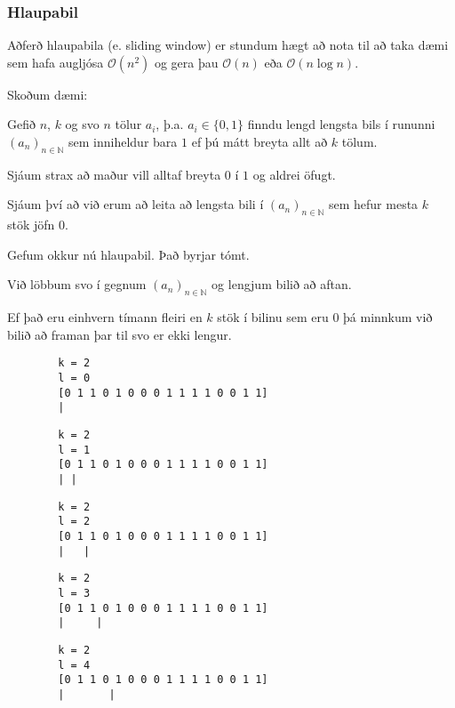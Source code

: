 {
	\frametitle{Hlaupabil}
	{
		\item<1-> Aðferð hlaupabila (e. sliding window) er stundum hægt að nota til að taka
				dæmi sem hafa augljósa $\mathcal{O}(n^2)$ og gera þau $\mathcal{O}(n)$ eða $\mathcal{O}(n\log n)$.
	}
}

{
	{
		\item<1-> Skoðum dæmi:
		\item<2-> Gefið $n$, $k$ og svo $n$ tölur $a_i$, þ.a. $a_i \in \{0, 1\}$ finndu
			lengd lengsta bils í rununni $(a_n)_{n \in \mathbb{N}}$ sem inniheldur bara $1$ ef þú mátt breyta allt að $k$ tölum.
		\item<3-> Sjáum strax að maður vill alltaf breyta $0$ í $1$ og aldrei öfugt.
		\item<4-> Sjáum því að við erum að leita að lengsta bili í $(a_n)_{n \in \mathbb{N}}$ sem hefur mesta $k$ stök jöfn $0$.
		\item<5-> Gefum okkur nú hlaupabil. Það byrjar tómt.
		\item<6-> Við löbbum svo í gegnum $(a_n)_{n \in \mathbb{N}}$ og lengjum bilið að aftan.
		\item<7-> Ef það eru einhvern tímann fleiri en $k$ stök í bilinu sem eru $0$ þá minnkum við bilið að framan þar til svo er ekki lengur.
	}
}

{ \begin{verbatim}
        k = 2
        l = 0
        [0 1 1 0 1 0 0 0 1 1 1 1 0 0 1 1]
        |
\end{verbatim} }

{ \begin{verbatim}
        k = 2
        l = 1
        [0 1 1 0 1 0 0 0 1 1 1 1 0 0 1 1]
        | |
\end{verbatim} }

{ \begin{verbatim}
        k = 2
        l = 2
        [0 1 1 0 1 0 0 0 1 1 1 1 0 0 1 1]
        |   |
\end{verbatim} }

{ \begin{verbatim}
        k = 2
        l = 3
        [0 1 1 0 1 0 0 0 1 1 1 1 0 0 1 1]
        |     |
\end{verbatim} }

{ \begin{verbatim}
        k = 2
        l = 4
        [0 1 1 0 1 0 0 0 1 1 1 1 0 0 1 1]
        |       |
\end{verbatim} }

